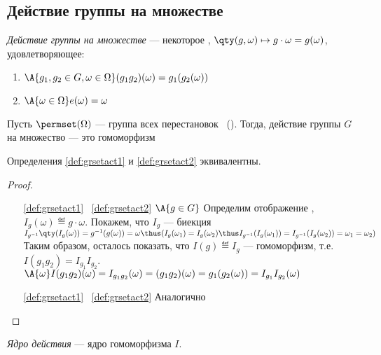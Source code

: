 \subsection{Действие группы на множестве}
\begin{definition}\label{def:grsetact1}
  \emph{Действие группы на множестве \Omega} --- некоторое , $\qty(g, \omega)\mapsto g\cdot\omega=g(\omega)$, удовлетворяющее:
  \begin{enumerate}
    \item $\A{g_1, g_2 \in G, \omega\in \Omega}(g_1g_2)(\omega)=g_1(g_2(\omega))$
    \item $\A{\omega \in \Omega} e(\omega)=\omega$
  \end{enumerate}
\end{definition}

\begin{definition}[Альтернативное]\label{def:grsetact2}
  Пусть $\permset(\Omega)$ --- группа всех перестановок \Omega\ (). Тогда, действие группы $G$ на множество \Omega --- это гомоморфизм 
\end{definition}

\begin{theorem}
  Определения \ref{def:grsetact1} и \ref{def:grsetact2} эквивалентны.
\end{theorem}
\begin{proof}
  \theoremlistshack
  \begin{itemize}[leftmargin=16ex]
    \item[\ref{def:grsetact1} \rightarrow\ \ref{def:grsetact2}] $\A{g\in G}$ Определим отображение , $I_g(\omega)\eqdef g\cdot\omega$. Покажем, что $I_g$ --- биекция\\
          $I_{g^{-1}}\qty(I_g(\omega))=g^{-1}(g(\omega))=\omega\thus  (I_g(\omega_1)=I_g(\omega_2)\thus I_{g^{-1}}(I_g(\omega_1))=I_{g^{-1}}(I_g(\omega_2))=\omega_1=\omega_2)$\\
          Таким образом, осталось показать, что $I(g)\eqdef I_g$ --- гомоморфизм, т.\:е. $I(g_1g_2)=I_{g_1}I_{g_2}$. $\A{\omega} I(g_1g_2)(\omega)=I_{g_1g_2}(\omega)=(g_1g_2)(\omega)=g_1(g_2(\omega))=I_{g_1}I_{g_2}(\omega)$
    \item[\ref{def:grsetact1} \leftarrow\ \ref{def:grsetact2}] Аналогично
  \end{itemize}
\end{proof}

\begin{definition}
  \emph{Ядро действия} --- ядро гомоморфизма $I$.
\end{definition}

